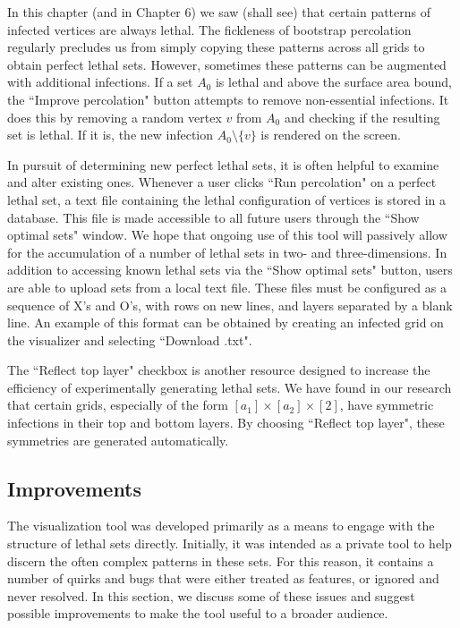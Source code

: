 In this chapter (and in Chapter 6) we saw (shall see) that certain patterns of infected vertices are always lethal. The fickleness of bootstrap percolation regularly precludes us from simply copying these patterns across all grids to obtain perfect lethal sets. However, sometimes these patterns can be augmented with additional infections. If a set $A_0$ is lethal and above the surface area bound, the ``Improve percolation" button attempts to remove non-essential infections. It does this by removing a random vertex $v$ from $A_0$ and checking if the resulting set is lethal. If it is, the new infection $A_0 \setminus \{v\}$ is rendered on the screen. 

In pursuit of determining new perfect lethal sets, it is often helpful to examine and alter existing ones. Whenever a user clicks ``Run percolation" on a perfect lethal set, a text file containing the lethal configuration of vertices is stored in a database. This file is made accessible to all future users through the ``Show optimal sets" window. We hope that ongoing use of this tool will passively allow for the accumulation of a number of lethal sets in two- and three-dimensions. In addition to accessing known lethal sets via the ``Show optimal sets" button, users are able to upload sets from a local text file. These files must be configured as a sequence of X's and O's, with rows on new lines, and layers separated by a blank line. An example of this format can be obtained by creating an infected grid on the visualizer and selecting ``Download .txt". 

The ``Reflect top layer" checkbox is another resource designed to increase the efficiency of experimentally generating lethal sets. We have found in our research that certain grids, especially of the form $[a_1] \times [a_2] \times [2]$, have symmetric infections in their top and bottom layers. By choosing ``Reflect top layer", these symmetries are generated automatically. 


\subsection{Improvements}

The visualization tool was developed primarily as a means to engage with the structure of lethal sets directly. Initially, it was intended as a private tool to help discern the often complex patterns in these sets. For this reason, it contains a number of quirks and bugs that were either treated as features, or ignored and never resolved. In this section, we discuss some of these issues and suggest possible improvements to make the tool useful to a broader audience. 


